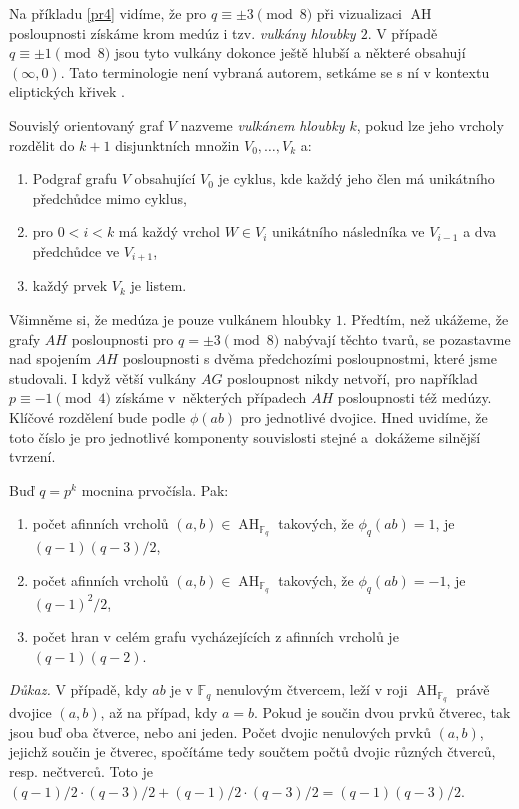 \documentclass[12pt]{report}
\DeclareMathOperator{\AH}{AH}
\begin{document}
Na příkladu \ref{pr4} vidíme, že pro $q \equiv \pm 3 \pmod{8}$ při vizualizaci $\AH$ posloupnosti získáme krom medúz i tzv. \textit{vulkány hloubky $2$}. V případě $q \equiv \pm 1 \pmod{8}$ jsou tyto vulkány dokonce ještě hlubší a některé obsahují $(\infty,0)$. Tato terminologie není vybraná autorem, setkáme se s ní v kontextu eliptických křivek \cite{Suchanek}. 
\begin{definice}
Souvislý orientovaný graf $V$ nazveme \textit{vulkánem hloubky $k$}, pokud lze jeho vrcholy rozdělit do $k+1$ disjunktních množin $V_0,\dots,V_k$ a:
\begin{enumerate}
\item Podgraf grafu $V$ obsahující $V_0$ je cyklus, kde každý jeho člen má unikátního předchůdce mimo cyklus,
\item pro $0 <i < k$ má každý vrchol $W \in V_i$ unikátního následníka ve $V_{i-1}$ a dva předchůdce ve $V_{i+1}$,
\item každý prvek $V_k$ je listem.
\end{enumerate}
\end{definice}
Všimněme si, že medúza je pouze vulkánem hloubky $1$. Předtím, než ukážeme, že grafy $AH$ posloupnosti pro $q = \pm 3 \pmod{8}$ nabývají těchto tvarů, se pozastavme nad spojením $AH$ posloupnosti s dvěma předchozími posloupnostmi, které jsme studovali. I když větší vulkány $AG$ posloupnost nikdy netvoří, pro například $p \equiv -1 \pmod{4}$ získáme v~některých případech $AH$ posloupnosti též medúzy. Klíčové rozdělení bude podle $\phi(ab)$ pro jednotlivé dvojice. Hned uvidíme, že toto číslo je pro jednotlivé komponenty souvislosti stejné a~dokážeme silnější tvrzení. 
\begin{veta}\label{pocetv}
Buď $q = p^k$ mocnina prvočísla. Pak:
\begin{enumerate}
\item počet afinních vrcholů $(a,b) \in \AH_{\mathbb{F}_q}$ takových, že $\phi_q(ab) = 1$, je $(q-1)(q-3)/2$, 
\item počet afinních vrcholů $(a,b) \in \AH_{\mathbb{F}_q}$ takových, že $\phi_q(ab) = -1$, je $(q-1)^2/2$,
\item počet hran v celém grafu vycházejících z afinních vrcholů je $(q-1)(q-2)$.
\end{enumerate}

\end{veta}  
\noindent \textit{Důkaz.} V případě, kdy $ab$ je v $\mathbb{F}_q$ nenulovým čtvercem, leží v roji $\AH_{\mathbb{F}_q}$ právě dvojice $(a,b)$, až na případ, kdy $a=b$. Pokud je součin dvou prvků čtverec, tak jsou buď oba čtverce, nebo ani jeden. Počet dvojic nenulových prvků $(a,b)$, jejichž součin je čtverec, spočítáme tedy součtem počtů dvojic různých čtverců, resp. nečtverců. Toto je $(q-1)/2 \cdot (q-3)/2 + (q-1)/2 \cdot (q-3)/2 =  (q-1)(q-3)/2$.
\end{document}
